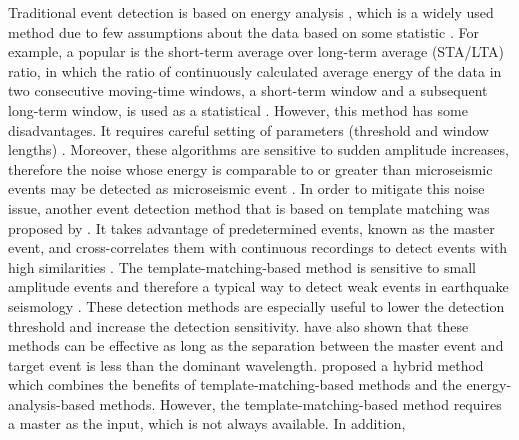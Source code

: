 Traditional event detection is based on energy analysis \citep{hatherly1982computer,allen1978automatic,vaezi2015comparison}, which is a widely used method due to few assumptions about the data based on some statistic . For example, a popular  is the short-term average over long-term average (STA/LTA) ratio, in which the ratio of  continuously calculated average energy of the data in two consecutive moving-time windows, a short-term window and a subsequent long-term window, is used as a statistical   \citep{allen1982automatic,allen1978automatic,vaezi2015comparison}. However, this method has some disadvantages. It requires  careful setting of parameters (threshold and window lengths) \citep{trnkoczy1999topic}. Moreover, these algorithms are sensitive to sudden amplitude increases, therefore the noise whose energy is comparable to or greater than microseismic events may be detected as  microseismic event \citep{withers1998comparison}. In order to mitigate this noise issue, another event detection method that is based on template matching was proposed by \cite{gibbons2006detection}. It takes advantage of predetermined events, known as the master event, and cross-correlates them with continuous recordings to detect events with high similarities \citep{gibbons2006detection,song2010improved,senkaya2014semi}. The template-matching-based method is sensitive to small amplitude events and therefore a typical way to detect weak events in earthquake seismology \citep{song2010improved}. These detection methods are especially useful to lower the detection threshold and increase the detection sensitivity. \cite{michelet2007fracture,arrowsmith2006technique} have also shown that these methods can be effective as long as the separation between the master event and target event is less than the dominant wavelength. \cite{gelchinsky1983automatic} proposed a hybrid method which combines the benefits of template-matching-based methods and the energy-analysis-based methods. However, the template-matching-based method requires a master  as the input, which is not always available. In addition, 

